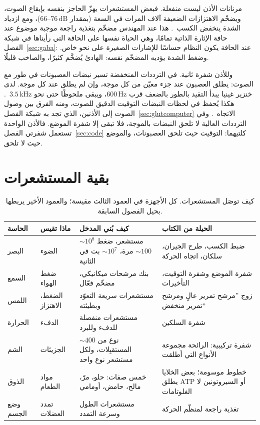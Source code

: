 مرنانات الأذن ليست منفعلة. فبعض المستشعرات يهزّ الحاجز بنفسه بإيقاع الصوت، ويضخّم الاهتزازات الضعيفة آلاف المرات في السعة (بمقدار $66\text{--}76\,\text{dB}$)، ومع ازدياد الشدة ينخفض الكسب~\cite{Ruggero1997,Robles2001}. هذا عند المهندس مضخّم بتغذية راجعة موجبة موضوع عند حافة الإثارة الذاتية تمامًا، وهي الحياة نفسها على الحافة التي رأيناها في شبكة الفصل~\ref{sec:gaba}: عند الحافة يكون النظام حساسًا للإشارات الصغيرة على نحو خاص. وضغط الشدة يؤديه المضخّم نفسه: الهادئ يُضخَّم كثيرًا، والصاخب قليلًا.

وللأذن شفرة ثانية. في الترددات المنخفضة تسير نبضات العصبونات في طور مع الصوت: يطلق العصبون عند جزء معيّن من كل موجة، وإن لم يطلق عند كل موجة. لدى خنزير غينيا يبدأ التقيد بالطور بالضعف قرب $600\,\text{Hz}$، ويبقى ملحوظًا حتى نحو $3.5\,\text{kHz}$~\cite{PalmerRussell1986}. هكذا يُحفظ في لحظات النبضات التوقيت الدقيق للصوت، ومنه الفرق بين وصول الصوت إلى الأذنين، الذي تجد به شبكة الفصل~\ref{sec:glutcomputer} الاتجاه~\cite{Grothe2010}. وفي الترددات العالية لا تلحق النبضات بالموجة، فلا تبقى إلا شفرة الموضع. فالأذن الواحدة تستعمل شفرتي الفصل~\ref{sec:code} كلتيهما: التوقيت حيث تلحق العصبونات، والموضع حيث لا تلحق.

\section{بقية المستشعرات}

\begin{table}[t]
\centering
\footnotesize
\setlength{\tabcolsep}{3pt}
\renewcommand{\arraystretch}{1.15}
\begin{tabular}{>{\raggedright}p{1.9cm}>{\raggedright}p{2.6cm}>{\raggedright}p{4.0cm}>{\raggedright\arraybackslash}p{4.6cm}}
\toprule
الحاسة & ماذا تقيس & كيف بُني المدخل & الحيلة من الكتاب \\
\midrule
البصر & الضوء & $\sim10^8$ مستشعر، ضغط $\sim100$ مرة، $\sim10^7$ بت في الثانية & ضبط الكسب، طرح الجيران، سلكان، اتجاه الحركة \\
السمع & ضغط الهواء & بنك مرشحات ميكانيكي، مضخّم فعّال & شفرة الموضع وشفرة التوقيت، التأخيرات \\
اللمس & الضغط، الاهتزاز & مستشعرات سريعة التعوّد وبطيئته & زوج ”مرشح تمرير عالٍ ومرشح تمرير منخفض“ \\
الحرارة & الدفء & مستشعرات منفصلة للدفء وللبرد & شفرة السلكين \\
الشم & الجزيئات & $\sim400$ نوع من المستقبِلات، ولكل مستشعر نوع واحد & شفرة تركيبية: الرائحة مجموعة الأنواع التي أطلقت \\
الذوق & مواد الطعام & خمس صفات: حلو، مرّ، مالح، حامض، أومامي & خطوط موسومة؛ بعض الخلايا يطلق \foreignlanguage{english}{ATP} أو السيروتونين لا الغلوتامات \\
وضع الجسم & تمدد العضلات & مستشعرات الطول وسرعة التمدد & تغذية راجعة لمنظّم الحركة \\
\bottomrule
\end{tabular}
\caption{كيف توصَل المستشعرات. كل الأجهزة في العمود الثالث مقيسة؛ والعمود الأخير يربطها بحيل الفصول السابقة.}
\label{tab:sensors}
\end{table}

